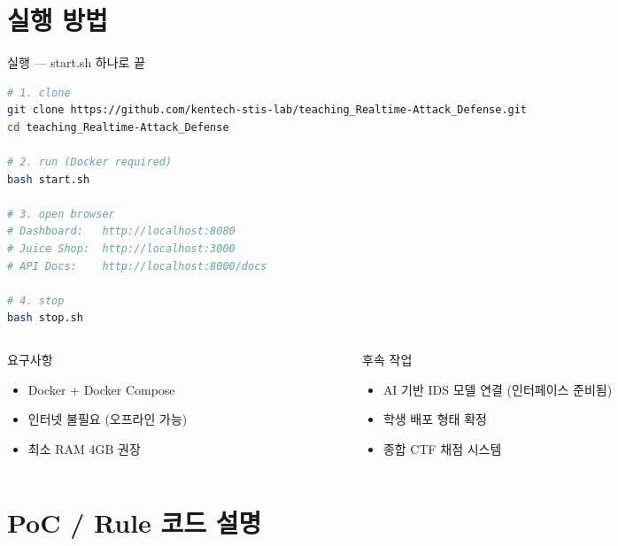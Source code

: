 \documentclass[aspectratio=169,10pt]{beamer}
\begin{document}
\section{실행 방법}

\begin{frame}[fragile]{실행 — start.sh 하나로 끝}
\begin{lstlisting}[language=bash]
# 1. clone
git clone https://github.com/kentech-stis-lab/teaching_Realtime-Attack_Defense.git
cd teaching_Realtime-Attack_Defense

# 2. run (Docker required)
bash start.sh

# 3. open browser
# Dashboard:   http://localhost:8080
# Juice Shop:  http://localhost:3000
# API Docs:    http://localhost:8000/docs

# 4. stop
bash stop.sh
\end{lstlisting}

\vspace{0.3em}
\begin{columns}[T]
\begin{column}{0.48\textwidth}
\begin{block}{요구사항}
\begin{itemize}
    \item Docker + Docker Compose
    \item 인터넷 불필요 (오프라인 가능)
    \item 최소 RAM 4GB 권장
\end{itemize}
\end{block}
\end{column}
\begin{column}{0.48\textwidth}
\begin{block}{후속 작업}
\begin{itemize}
    \item AI 기반 IDS 모델 연결 (인터페이스 준비됨)
    \item 학생 배포 형태 확정
    \item 종합 CTF 채점 시스템
\end{itemize}
\end{block}
\end{column}
\end{columns}
\end{frame}

\section{PoC / Rule 코드 설명}
\end{document}
